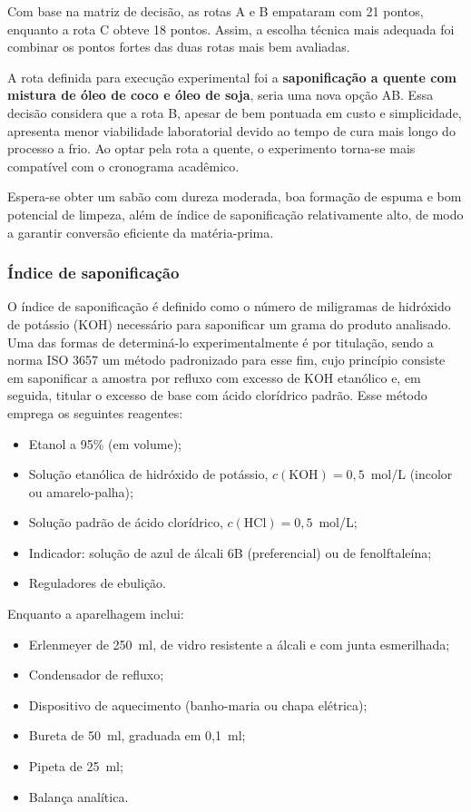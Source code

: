 Com base na matriz de decisão, as rotas A e B empataram com 21 pontos, enquanto a rota C obteve 18 pontos. Assim, a escolha técnica mais adequada foi combinar os pontos fortes das duas rotas mais bem avaliadas.

A rota definida para execução experimental foi a \textbf{saponificação a quente com mistura de óleo de coco e óleo de soja}, seria uma nova opção AB. Essa decisão considera que a rota B, apesar de bem pontuada em custo e simplicidade, apresenta menor viabilidade laboratorial devido ao tempo de cura mais longo do processo a frio. Ao optar pela rota a quente, o experimento torna-se mais compatível com o cronograma acadêmico.

Espera-se obter um sabão com dureza moderada, boa formação de espuma e bom potencial de limpeza, além de índice de saponificação relativamente alto, de modo a garantir conversão eficiente da matéria-prima.

\subsubsection{Índice de saponificação}

O índice de saponificação é definido como o número de miligramas de hidróxido de potássio (KOH) necessário para saponificar um grama do produto analisado. Uma das formas de determiná-lo experimentalmente é por titulação, sendo a norma ISO 3657 \cite{iso3657} um método padronizado para esse fim, cujo princípio consiste em saponificar a amostra por refluxo com excesso de KOH etanólico e, em seguida, titular o excesso de base com ácido clorídrico padrão. Esse método emprega os seguintes reagentes:

\begin{itemize}
    \item Etanol a 95\% (em volume);
    \item Solução etanólica de hidróxido de potássio, $c(\text{KOH}) = 0{,}5$~mol/L (incolor ou amarelo-palha);
    \item Solução padrão de ácido clorídrico, $c(\text{HCl}) = 0{,}5$~mol/L;
    \item Indicador: solução de azul de álcali 6B (preferencial) ou de fenolftaleína;
    \item Reguladores de ebulição.
\end{itemize}

\noindent Enquanto a aparelhagem inclui:

\begin{itemize}
    \item Erlenmeyer de 250~ml, de vidro resistente a álcali e com junta esmerilhada;
    \item Condensador de refluxo;
    \item Dispositivo de aquecimento (banho-maria ou chapa elétrica);
    \item Bureta de 50~ml, graduada em 0,1~ml;
    \item Pipeta de 25~ml;
    \item Balança analítica.
\end{itemize}

